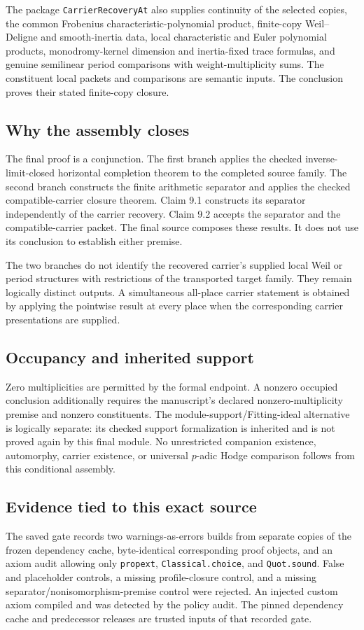 The package \nolinkurl{CarrierRecoveryAt} also supplies continuity of the selected copies, the common Frobenius characteristic-polynomial product, finite-copy Weil--Deligne and smooth-inertia data, local characteristic and Euler polynomial products, monodromy-kernel dimension and inertia-fixed trace formulas, and genuine semilinear period comparisons with weight-multiplicity sums. The constituent local packets and comparisons are semantic inputs. The conclusion proves their stated finite-copy closure.

\subsection{Why the assembly closes}
The final proof is a conjunction. The first branch applies the checked inverse-limit-closed horizontal completion theorem to the completed source family. The second branch constructs the finite arithmetic separator and applies the checked compatible-carrier closure theorem. Claim 9.1 constructs its separator independently of the carrier recovery. Claim 9.2 accepts the separator and the compatible-carrier packet. The final source composes these results. It does not use its conclusion to establish either premise.

The two branches do not identify the recovered carrier's supplied local Weil or period structures with restrictions of the transported target family. They remain logically distinct outputs. A simultaneous all-place carrier statement is obtained by applying the pointwise result at every place when the corresponding carrier presentations are supplied.

\subsection{Occupancy and inherited support}
Zero multiplicities are permitted by the formal endpoint. A nonzero occupied conclusion additionally requires the manuscript's declared nonzero-multiplicity premise and nonzero constituents. The module-support/Fitting-ideal alternative is logically separate: its checked support formalization is inherited and is not proved again by this final module. No unrestricted companion existence, automorphy, carrier existence, or universal $p$-adic Hodge comparison follows from this conditional assembly.

\subsection{Evidence tied to this exact source}
The saved gate records two warnings-as-errors builds from separate copies of the frozen dependency cache, byte-identical corresponding proof objects, and an axiom audit allowing only \nolinkurl{propext}, \nolinkurl{Classical.choice}, and \nolinkurl{Quot.sound}. False and placeholder controls, a missing profile-closure control, and a missing separator/nonisomorphism-premise control were rejected. An injected custom axiom compiled and was detected by the policy audit. The pinned dependency cache and predecessor releases are trusted inputs of that recorded gate.

